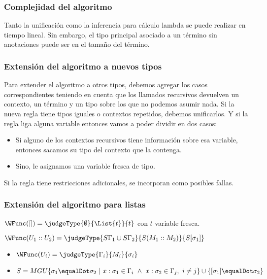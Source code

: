 \subsubsection{Complejidad del algoritmo}
Tanto la unificación como la inferencia para cálculo lambda se puede realizar en tiempo lineal. Sin embargo, el tipo principal asociado a un término sin anotaciones puede ser  en el tamaño del término.

\subsubsection{Extensión del algoritmo a nuevos tipos}
Para extender el algoritmo a otros tipos, debemos agregar los casos correspondientes teniendo en cuenta que los llamados recursivos devuelven un contexto, un término y un tipo sobre los que no podemos asumir nada.
Si la nueva regla tiene tipos iguales o contextos repetidos, debemos unificarlos. Y si la regla liga alguna variable entonces vamos a poder dividir en dos casos: 
\begin{itemize}
	\item Si alguno de los contextos recursivos tiene información sobre esa variable, entonces sacamos su tipo del contexto que la contenga.
	\item Sino, le asignamos una variable fresca de tipo.
\end{itemize}

Si la regla tiene restricciones adicionales, se incorporan como posibles fallas.

\subsubsection{Extensión del algoritmo para listas}
$\WFunc([]) = \judgeType{\emptyset}{\List{t}}{t}$ con $t$ variable fresca.

$\WFunc(U_1::U_2) = \judgeType{S\Gamma_1\cup S\Gamma_2}{S(M_1::M_2)}{S[\sigma_1]}$

\begin{centrado}
	\begin{itemize}
		\item $\WFunc(U_i) = \judgeType{\Gamma_i}{M_i}{\sigma_i}$
		\item $S = MGU\{\sigma_1\equalDot \sigma_2~|~x:\sigma_1\in\Gamma_i~\land~x:\sigma_2\in\Gamma_j,~i\neq j\}\cup\{[\sigma_1]\equalDot\sigma_2\} $
	\end{itemize}
\end{centrado}


